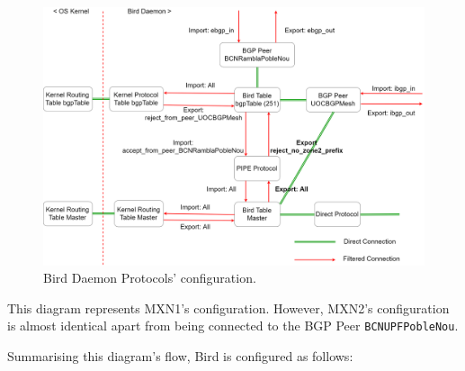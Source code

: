 \begin{landscape}
\begin{figure}[ht!]
    \centering
    \includegraphics[width=0.7\hsize]{images/tables}
    \caption{Bird Daemon Protocols' configuration.}
    \label{fig:tables}
\end{figure}
This diagram represents MXN1's configuration. However, MXN2's configuration is almost identical apart from being connected to the BGP Peer \texttt{BCNUPFPobleNou}. 
\end{landscape}
\newpage


Summarising this diagram's flow, Bird is configured as follows:


